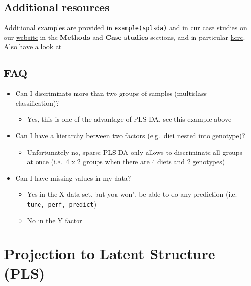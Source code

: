 \documentclass[]{book}
\providecommand{\tightlist}{%
  \setlength{\itemsep}{0pt}\setlength{\parskip}{0pt}}
\theoremstyle{definition}
\theoremstyle{definition}
\theoremstyle{definition}
\theoremstyle{remark}
\begin{document}
\section{Additional resources}\label{additional-resources-1}

Additional examples are provided in \texttt{example(splsda)} and in our
case studies on our \href{http://www.mixomics.org}{website} in the
\textbf{Methods} and \textbf{Case studies} sections, and in particular
\href{http://mixomics.org/case-studies/splsda-srbct/}{here}. Also have a
look at \citep{Lec11}

\section{FAQ}\label{faq-1}

\begin{itemize}
\tightlist
\item
  Can I discriminate more than two groups of samples (multiclass
  classification)?

  \begin{itemize}
  \tightlist
  \item
    Yes, this is one of the advantage of PLS-DA, see this example above
  \end{itemize}
\item
  Can I have a hierarchy between two factors (e.g.~diet nested into
  genotype)?

  \begin{itemize}
  \tightlist
  \item
    Unfortunately no, sparse PLS-DA only allows to discriminate all
    groups at once (i.e.~4 x 2 groups when there are 4 diets and 2
    genotypes)
  \end{itemize}
\item
  Can I have missing values in my data?

  \begin{itemize}
  \tightlist
  \item
    Yes in the X data set, but you won't be able to do any prediction
    (i.e. \texttt{tune,\ perf,\ predict})
  \item
    No in the Y factor
  \end{itemize}
\end{itemize}

\chapter{Projection to Latent Structure (PLS)}\label{pls}
\end{document}

